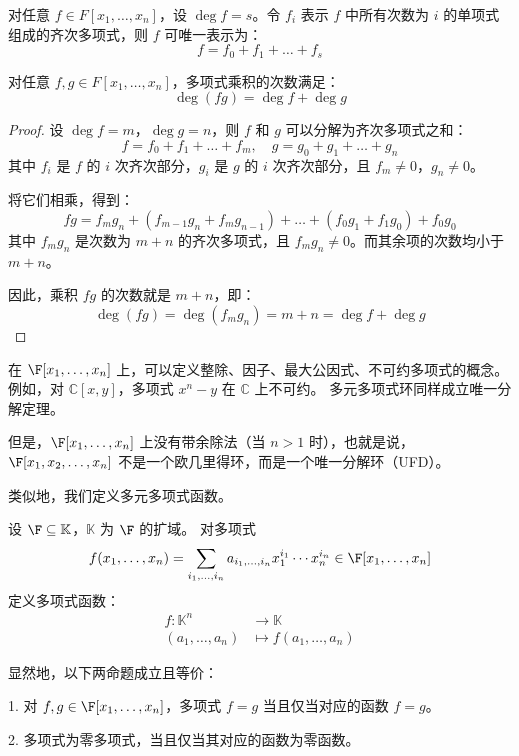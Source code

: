 对任意 \( f \in F[x_1,\dots,x_n] \)，设 \( \deg f = s \)。令 \( f_i \) 表示 \( f \) 中所有次数为 \( i \) 的单项式组成的齐次多项式，则 \( f \) 可唯一表示为：
\[
f = f_0 + f_1 + \dots + f_s
\]
\begin{definition}
	对任意 \( f,g \in F[x_1,\dots,x_n] \)，多项式乘积的次数满足：
	\[
	\deg(fg) = \deg f + \deg g
	\]
\end{definition}
\begin{proof}
	设 \( \deg f = m \)，\( \deg g = n \)，则 \( f \) 和 \( g \) 可以分解为齐次多项式之和：
	\[
	f = f_0 + f_1 + \dots + f_m, \quad g = g_0 + g_1 + \dots + g_n
	\]
	其中 \( f_i \) 是 \( f \) 的 \( i \) 次齐次部分，\( g_i \) 是 \( g \) 的 \( i \) 次齐次部分，且 \( f_m \neq 0 \)，\( g_n \neq 0 \)。
	
	将它们相乘，得到：
	\[
	fg = f_m g_n + (f_{m-1}g_n + f_m g_{n-1}) + \dots + (f_0 g_1 + f_1 g_0) + f_0 g_0
	\]
	其中 \( f_m g_n \) 是次数为 \( m+n \) 的齐次多项式，且 \( f_m g_n \neq 0 \)。而其余项的次数均小于 \( m+n \)。
	
	因此，乘积 \( fg \) 的次数就是 \( m+n \)，即：
	\[
	\deg(fg) = \deg(f_m g_n) = m + n = \deg f + \deg g
	\]
\end{proof}
在 \( \F[x_1,\dots,x_n] \) 上，可以定义整除、因子、最大公因式、不可约多项式的概念。
例如，对 \( \mathbb{C}[x,y] \)，多项式 \( x^n - y \) 在 \( \mathbb{C} \) 上不可约。
多元多项式环同样成立唯一分解定理。

但是，\( \F[x_1,\dots,x_n] \) 上没有带余除法（当 \( n>1 \) 时），也就是说，\( \F[x_1,x_2,\dots,x_n] \) 不是一个欧几里得环，而是一个唯一分解环（UFD）。


类似地，我们定义多元多项式函数。
\begin{definition}\label{p1:concept:c1-l1428}
	设 \( \F \subseteq \mathbb{K} \)，\( \mathbb{K}\) 为 \( \F \) 的扩域。
	对多项式
	\[
	f(x_1,\dots,x_n) = \sum_{i_1,\dots,i_n} a_{i_1,\dots,i_n} x_1^{i_1} \cdots x_n^{i_n} \in \F[x_1,\dots,x_n]
	\]
	定义多项式函数：
	\[
	\begin{aligned}
		f: \mathbb{K}^n &\to \mathbb{K} \\
		(a_1,\dots,a_n) &\mapsto f(a_1,\dots,a_n)
	\end{aligned}
	\]
\end{definition}


显然地，以下两命题成立且等价：

1.  对 \( f,g \in \F[x_1,\dots,x_n] \)，多项式 \( f=g \) 当且仅当对应的函数 \( f=g \)。

2.  多项式为零多项式，当且仅当其对应的函数为零函数。

